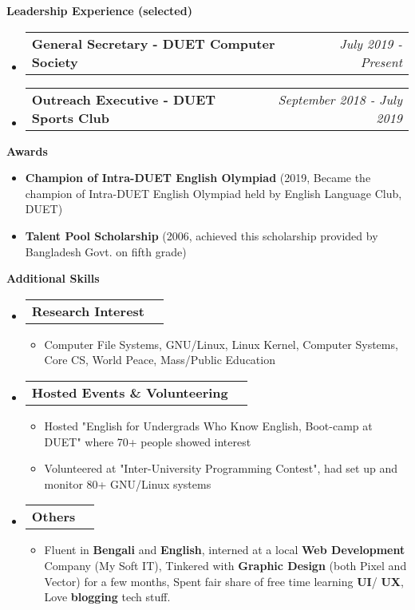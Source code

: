 \documentclass[letterpaper,10pt]{article}
\makeatletter
\newcommand{\resheading}[1]{{\large \colorbox{mygrey}{\begin{minipage}{\textwidth}{\textbf{#1 \vphantom{p\^{E}}}}\end{minipage}}}}
\newcommand{\ressubheading}[4]{
	\begin{tabular*}{7.1in}{l@{\extracolsep{\fill}}r}
		\textbf{#1} & \textit{#4} \\
	\end{tabular*}\vspace{-6pt}}
\makeatother
\begin{document}
	\vspace{0.2in}
	
	\resheading{Leadership Experience (selected)}
	\begin{itemize}
		\item \ressubheading{General Secretary - DUET Computer Society}{}{}{July 2019 - Present}
		\item \ressubheading{Outreach Executive - DUET Sports Club}{}{}{September 2018 - July 2019}
		
	\end{itemize}

	\vspace{0.3in}
	
	\resheading{Awards}
	\begin{itemize}
				
		\item \textbf{Champion of Intra-DUET English Olympiad} (2019, Became the champion of Intra-DUET English Olympiad held by English Language Club, DUET)
	
		\item \textbf{Talent Pool Scholarship} (2006, achieved this scholarship provided by Bangladesh Govt. on fifth grade)

	\end{itemize}

	
	\vspace{0.2in}
	
	\resheading{Additional Skills}
	\begin{itemize}
		\item \ressubheading{Research Interest}{}{}{}
		\begin{itemize}
			\item Computer File Systems, GNU/Linux, Linux Kernel, Computer Systems, Core CS,  World Peace, Mass/Public Education
		\end{itemize}
		
		\item \ressubheading{Hosted Events \& Volunteering}{}{}{}
		\begin{itemize}
			\item Hosted "English for Undergrads Who Know English, Boot-camp at DUET" where 70+ people showed interest
			
			\item Volunteered at "Inter-University Programming Contest", had set up and monitor 80+ GNU/Linux systems
		\end{itemize}

	
		\item \ressubheading{Others}{}{}{}
		\begin{itemize}
			\item Fluent in \textbf{Bengali} and \textbf{English}, interned at a local \textbf{Web Development} Company (My Soft IT), Tinkered with \textbf{Graphic Design} (both Pixel and Vector) for a few months, Spent fair share of free time learning \textbf{UI}/ \textbf{UX}, Love \textbf{blogging} tech stuff.
		\end{itemize}


	\end{itemize}
\vfill
\end{document}
